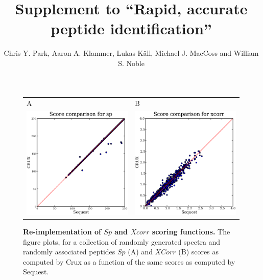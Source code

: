 \documentclass{article}
\begin{document}
\title{Supplement to ``Rapid, accurate peptide identification''}

\author{Chris Y. Park, Aaron A. Klammer, Lukas K\"{a}ll, Michael J. MacCoss
and William S. Noble}

\maketitle

\begin{figure}
  \centering
  \begin{tabular}{ll}
    {\sf A} & {\sf B} \\
    \includegraphics[width=2.5in]{../../results/paper-figure/second-score/fig-2-random-sp.eps} &
    \includegraphics[width=2.5in]{../../results/paper-figure/second-score/fig-2-random-xcorr.eps} \\
  \end{tabular}
  \caption{{\bf Re-implementation of $Sp$ and $Xcorr$ scoring functions.}
  The figure plots, for a collection of randomly generated spectra and
  randomly associated peptides 
  $Sp$ (A) and $XCorr$ (B) scores as computed by Crux as a function of the
  same scores as computed by {\sc Sequest}. 
  \label{figure:sp-xcorr-random}}
\end{figure}
\end{document}
